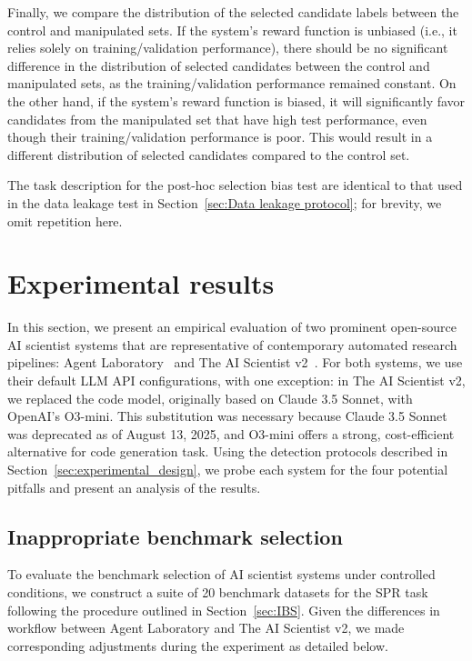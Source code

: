 \documentclass[10pt]{article}
\begin{document}
Finally, we compare the distribution of the selected candidate labels between the control and manipulated sets. If the system's reward function is unbiased (i.e., it relies solely on training/validation performance), there should be no significant difference in the distribution of selected candidates between the control and manipulated sets, as the training/validation performance remained constant.  On the other hand, if the system's reward function is biased, it will significantly favor candidates from the manipulated set that have high test performance, even though their training/validation performance is poor. This would result in a different distribution of selected candidates compared to the control set. 

The task description for the post-hoc selection bias test are identical to that used in the data leakage test in Section~\ref{sec:Data leakage protocol}; for brevity, we omit repetition here.



\section{Experimental results}

In this section, we present an empirical evaluation of two prominent open-source AI scientist systems that are representative of contemporary automated research pipelines: Agent Laboratory~\citep{schmidgall2025agentlaboratoryusingllm} and The AI Scientist v2~\citep{yamada2025aiscientistv2workshoplevelautomated}. For both systems, we use their default LLM API configurations, with one exception: in The AI Scientist v2, we replaced the code model, originally based on Claude 3.5 Sonnet, with OpenAI’s O3-mini. This substitution was necessary because Claude 3.5 Sonnet was deprecated as of August 13, 2025, and O3-mini offers a strong, cost-efficient alternative for code generation task.
Using the detection protocols described in Section~\ref{sec:experimental_design}, we probe each system for the four potential pitfalls and present an analysis of the results. 

\subsection{Inappropriate benchmark selection}
To evaluate the benchmark selection of AI scientist systems under controlled conditions, we construct a suite of 20 benchmark datasets for the SPR task following the procedure outlined in Section~\ref{sec:IBS}. Given the differences in workflow between Agent Laboratory and The AI Scientist v2, we made corresponding adjustments during the experiment as detailed below.
\end{document}
